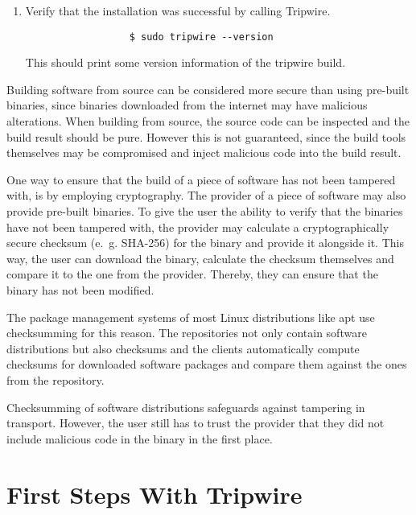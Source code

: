 \begin{enumerate}
\begin{enumerate}
          \item Verify that the installation was successful by calling Tripwire.

                \begin{verbatim}
                  $ sudo tripwire --version
                \end{verbatim}

                This should print some version information of the tripwire build.

        \end{enumerate}
\end{enumerate}

Building software from source can be considered more secure than using pre-built binaries, since binaries downloaded from the internet may have malicious alterations.
When building from source, the source code can be inspected and the build result should be pure.
However this is not guaranteed, since the build tools themselves may be compromised and inject malicious code into the build result.

One way to ensure that the build of a piece of software has not been tampered with, is by employing cryptography.
The provider of a piece of software may also provide pre-built binaries.
To give the user the ability to verify that the binaries have not been tampered with, the provider may calculate a cryptographically secure checksum (e.~g. SHA-256) for the binary and provide it alongside it.
This way, the user can download the binary, calculate the checksum themselves and compare it to the one from the provider.
Thereby, they can ensure that the binary has not been modified.

The package management systems of most Linux distributions like apt use checksumming for this reason.
The repositories not only contain software distributions but also checksums and the clients automatically compute checksums for downloaded software packages and compare them against the ones from the repository.
\parencite{debian_wiki_secureapt_nodate}

Checksumming of software distributions safeguards against tampering in transport.
However, the user still has to trust the provider that they did not include malicious code in the binary in the first place.

\section{First Steps With Tripwire}


